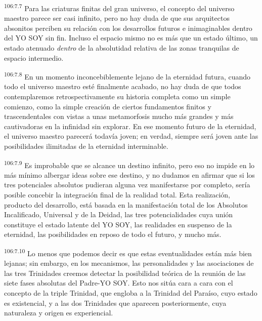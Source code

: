 \par
\textsuperscript{106:7.7} Para las criaturas finitas del gran universo, el concepto del universo maestro parece ser casi infinito, pero no hay duda de que sus arquitectos absonitos perciben su relación con los desarrollos futuros e inimaginables dentro del YO SOY sin fin. Incluso el espacio mismo no es más que un estado último, un estado atenuado \textit{dentro} de la absolutidad relativa de las zonas tranquilas de espacio intermedio.

\par
\textsuperscript{106:7.8} En un momento inconcebiblemente lejano de la eternidad futura, cuando todo el universo maestro esté finalmente acabado, no hay duda de que todos contemplaremos retrospectivamente su historia completa como un simple comienzo, como la simple creación de ciertos fundamentos finitos y trascendentales con vistas a unas metamorfosis mucho más grandes y más cautivadoras en la infinidad sin explorar. En ese momento futuro de la eternidad, el universo maestro parecerá todavía joven; en verdad, siempre será joven ante las posibilidades ilimitadas de la eternidad interminable.

\par
\textsuperscript{106:7.9} Es improbable que se alcance un destino infinito, pero eso no impide en lo más mínimo albergar ideas sobre ese destino, y no dudamos en afirmar que si los tres potenciales absolutos pudieran alguna vez manifestarse por completo, sería posible concebir la integración final de la realidad total. Esta realización, producto del desarrollo, está basada en la manifestación total de los Absolutos Incalificado, Universal y de la Deidad, las tres potencialidades cuya unión constituye el estado latente del YO SOY, las realidades en suspenso de la eternidad, las posibilidades en reposo de todo el futuro, y mucho más.

\par
\textsuperscript{106:7.10} Lo menos que podemos decir es que estas eventualidades están más bien lejanas; sin embargo, en los mecanismos, las personalidades y las asociaciones de las tres Trinidades creemos detectar la posibilidad teórica de la reunión de las siete fases absolutas del Padre-YO SOY. Esto nos sitúa cara a cara con el concepto de la triple Trinidad, que engloba a la Trinidad del Paraíso, cuyo estado es existencial, y a las dos Trinidades que aparecen posteriormente, cuya naturaleza y origen es experiencial.

